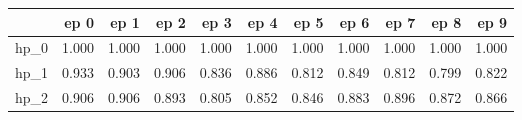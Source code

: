 \begin{tabular}{lrrrrrrrrrr}
\toprule
{} &   ep 0 &   ep 1 &   ep 2 &   ep 3 &   ep 4 &   ep 5 &   ep 6 &   ep 7 &   ep 8 &   ep 9 \\
\midrule
hp\_0 &  1.000 &  1.000 &  1.000 &  1.000 &  1.000 &  1.000 &  1.000 &  1.000 &  1.000 &  1.000 \\
hp\_1 &  0.933 &  0.903 &  0.906 &  0.836 &  0.886 &  0.812 &  0.849 &  0.812 &  0.799 &  0.822 \\
hp\_2 &  0.906 &  0.906 &  0.893 &  0.805 &  0.852 &  0.846 &  0.883 &  0.896 &  0.872 &  0.866 \\
\bottomrule
\end{tabular}
